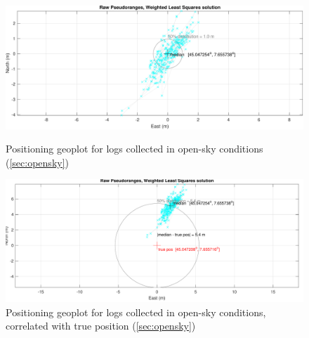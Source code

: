 \begin{figure}[H]
    \centering
    \begin{minipage}[b]{0.48\linewidth}
        \centering
        \includegraphics[width=1.00\linewidth]{images/pos_punto_3_precision.pdf}
        \caption{Positioning geoplot for logs collected in open-sky conditions (\ref{sec:opensky})}
        \label{fig:pos_punto_3_precision}
        \end{minipage}
    \hfill
    \begin{minipage}[b]{0.48\linewidth}
        \centering
        \includegraphics[width=1.00\linewidth]{images/pos_punto_3.pdf}
        \caption{Positioning geoplot for logs collected in open-sky conditions, correlated with true position (\ref{sec:opensky})}
        \label{fig:pos_punto_3}

    \end{minipage}
\end{figure}

